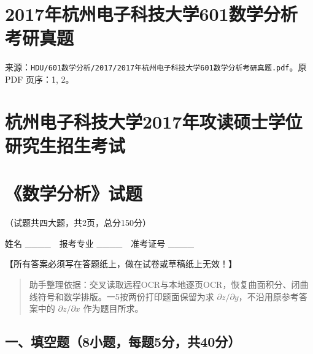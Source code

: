 \documentclass[11pt,fontset=fandol]{ctexart}
\begin{document}
\section{2017年杭州电子科技大学601数学分析考研真题}\label{ux5e74ux676dux5ddeux7535ux5b50ux79d1ux6280ux5927ux5b66601ux6570ux5b66ux5206ux6790ux8003ux7814ux771fux9898}

来源：\texttt{HDU/601数学分析/2017/2017年杭州电子科技大学601数学分析考研真题.pdf}。原
PDF 页序：1, 2。

\section{杭州电子科技大学2017年攻读硕士学位研究生招生考试}\label{ux676dux5ddeux7535ux5b50ux79d1ux6280ux5927ux5b662017ux5e74ux653bux8bfbux7855ux58ebux5b66ux4f4dux7814ux7a76ux751fux62dbux751fux8003ux8bd5}

\section{《数学分析》试题}\label{ux6570ux5b66ux5206ux6790ux8bd5ux9898}

（试题共四大题，共2页，总分150分）

姓名 \_\_\_\_　报考专业 \_\_\_\_　准考证号 \_\_\_\_

【所有答案必须写在答题纸上，做在试卷或草稿纸上无效！】

\begin{quote}
助手整理依据：交叉读取远程OCR与本地逐页OCR，恢复曲面积分、闭曲线符号和数学排版。一5按两份打印题面保留为求
\(\partial z/\partial y\)，不沿用原参考答案中的
\(\partial z/\partial x\) 作为题目所求。
\end{quote}

\subsection{一、填空题（8小题，每题5分，共40分）}\label{ux4e00ux586bux7a7aux98988ux5c0fux9898ux6bcfux98985ux5206ux517140ux5206}
\end{document}
